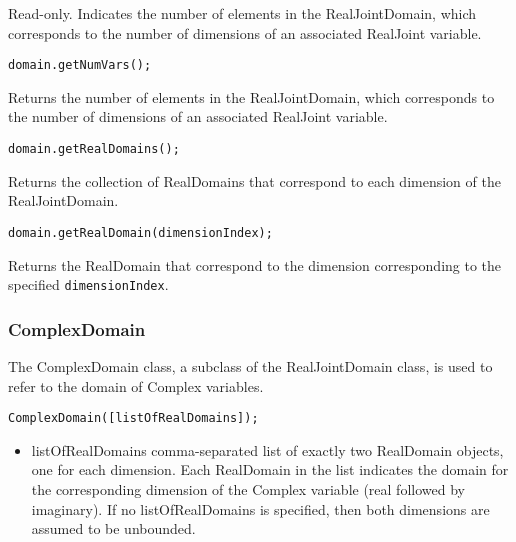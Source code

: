\ifmatlab
{}


Read-only.  Indicates the number of elements in the RealJointDomain, which corresponds to the number of dimensions of an associated RealJoint variable.
\fi

\ifjava
{}


\begin{lstlisting}
domain.getNumVars();
\end{lstlisting}

Returns the number of elements in the RealJointDomain, which corresponds to the number of dimensions of an associated RealJoint variable.


\begin{lstlisting}
domain.getRealDomains();
\end{lstlisting}

Returns the collection of RealDomains that correspond to each dimension of the RealJointDomain.


\begin{lstlisting}
domain.getRealDomain(dimensionIndex);
\end{lstlisting}

Returns the RealDomain that correspond to the dimension corresponding to the specified \texttt{dimensionIndex}.

\fi


\subsubsection{ComplexDomain}
\label{sec:ComplexDomain}

The ComplexDomain class, a subclass of the RealJointDomain class, is used to refer to the domain of Complex variables.


\ifmatlab
\begin{lstlisting}
ComplexDomain([listOfRealDomains]);
\end{lstlisting}

\begin{itemize}
\item listOfRealDomains comma-separated list of exactly two RealDomain objects, one for each dimension.  Each RealDomain in the list indicates the domain for the corresponding dimension of the Complex variable (real followed by imaginary).  If no listOfRealDomains is specified, then both dimensions are assumed to be unbounded.
\end{itemize}
\fi

